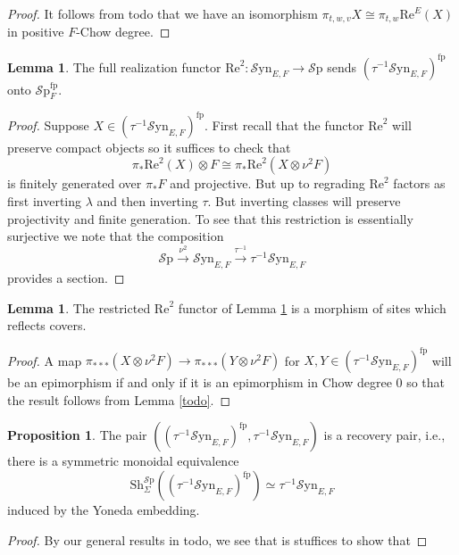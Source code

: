 \documentclass[10pt]{amsart}
\theoremstyle{definition}
\numberwithin{figure}{section}
\numberwithin{equation}{section}
\newtheorem{lemma}[figure]{Lemma}
\newtheorem{proposition}[figure]{Proposition}
\theoremstyle{cited}
\newcommand{\Sp}{{\mathcal{S}\mathrm{p}}}
\newcommand{\Sh}{\mathrm{Sh}}
\newcommand{\fp}{\mathrm{fp}}
\newcommand{\Syn}{\mathcal{S}\mathrm{yn}}
\renewcommand{\Re}{\mathrm{Re}}
\begin{document}
\begin{proof}
  It follows from todo that we have an isomorphism $\pi_{t,w,v}X\cong \pi_{t,w}\Re^E(X)$ in positive $F$-Chow degree.
\end{proof}

\begin{lemma}
  \label{lem:taulocalfptoffp}
  The full realization functor $\Re^2:\Syn_{E,F}\to \Sp$ sends $(\tau^{-1}\Syn_{E,F})^\fp$ onto $\Sp^\fp_F$.
\end{lemma}

\begin{proof}
  Suppose $X\in (\tau^{-1}\Syn_{E,F})^\fp$. First recall that the functor $\Re^2$ will preserve compact objects so it suffices to check that
  \[
  \pi_*\Re^2(X)\otimes F \cong \pi_*\Re^2(X\otimes \nu^2 F)
  \]
  is finitely generated over $\pi_*F$ and projective. But up to regrading $\Re^2$ factors as first inverting $\lambda$ and then inverting $\tau$. But inverting classes will preserve projectivity and finite generation. To see that this restriction is essentially surjective we note that the composition
  \[
  \Sp \xrightarrow{\nu^2} \Syn_{E,F}\xrightarrow{\tau^{-1}}\tau^{-1}\Syn_{E,F}
  \]
  provides a section. %
\end{proof}

\begin{lemma}
  The restricted $\Re^2$ functor of Lemma \ref{lem:taulocalfptoffp} is a morphism of sites which reflects covers.
\end{lemma}

\begin{proof}
  A map $\pi_{***}(X\otimes \nu^2 F)\to \pi_{***}(Y\otimes \nu^2 F)$ for $X,Y\in (\tau^{-1}\Syn_{E,F})^\fp$ will be an epimorphism if and only if it is an epimorphism in Chow degree $0$ so that the result follows from Lemma \ref{todo}. 
\end{proof}



\begin{proposition}
  The pair $((\tau^{-1}\Syn_{E,F})^\fp, \tau^{-1}\Syn_{E,F})$ is a recovery pair, i.e., there is a symmetric monoidal equivalence 
  \[
    \Sh_{\Sigma}^\Sp((\tau^{-1}\Syn_{E,F})^\fp)\simeq \tau^{-1}\Syn_{E,F}
  \]
  induced by the Yoneda embedding.
\end{proposition}

\begin{proof}
  By our general results in todo, we see that is stuffices to show that 
\end{proof}
\end{document}
